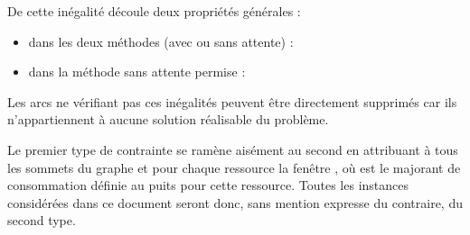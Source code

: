\documentclass[10pt,francais]{llncs}
\begin{document}
De cette in\'egalit\'e d\'ecoule deux propri\'et\'es g\'en\'erales :
\begin{itemize}
 \item dans les deux m\'ethodes (avec ou sans attente) :

 \item dans la m\'ethode sans attente permise :

\end{itemize}
Les arcs ne v\'erifiant pas ces in\'egalit\'es peuvent \^etre directement supprim\'es car ils n'appartiennent \`a aucune solution r\'ealisable du probl\`eme.

Le premier type de contrainte se ram\`ene ais\'ement au second en attribuant \`a tous les sommets du graphe et pour chaque ressource la fen\^etre , o\`u   est le majorant de consommation d\'efinie au puits pour cette ressource. Toutes les instances consid\'er\'ees dans ce document seront donc, sans mention expresse du contraire, du second type. 
\end{document}
